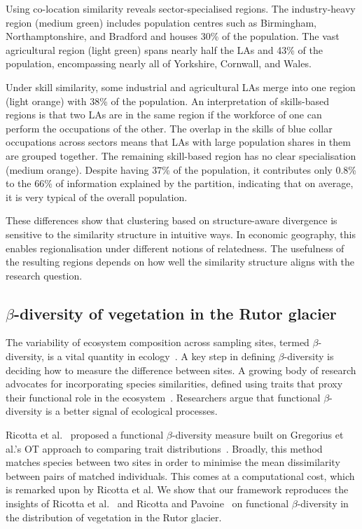 \documentclass[aps,pre,floats,floatfix,superscriptaddress,twocolumn,final,10pt]{revtex4-2}
\theoremstyle{definition}
\begin{document}
Using co-location similarity reveals sector-specialised regions. The industry-heavy region (medium green) includes population centres such as Birmingham, Northamptonshire, and Bradford and houses 30\% of the population. The vast agricultural region (light green) spans nearly half the LAs and 43\% of the population, encompassing nearly all of Yorkshire, Cornwall, and Wales.

Under skill similarity, some industrial and agricultural LAs merge into one region (light orange) with 38\% of the population. An interpretation of skills-based regions is that two LAs are in the same region if the workforce of one can perform the occupations of the other. The overlap in the skills of blue collar occupations across sectors means that LAs with large population shares in them are grouped together. The remaining skill-based region has no clear specialisation (medium orange). Despite having 37\% of the population, it contributes only 0.8\% to the 66\% of information explained by the partition, indicating that on average, it is very typical of the overall population. 

These differences show that clustering based on structure-aware divergence is sensitive to the similarity structure in intuitive ways. In economic geography, this enables regionalisation under different notions of relatedness. The usefulness of the resulting regions depends on how well the similarity structure aligns with the research question.



\subsection{$\beta$-diversity of vegetation in the Rutor glacier}
The variability of ecosystem composition across sampling sites, termed $\beta$-diversity, is a vital quantity in ecology~\cite{Whittaker1960,Anderson2011}. A key step in defining $\beta$-diversity is deciding how to measure the difference between sites. A growing body of research advocates for incorporating species similarities, defined using traits that proxy their functional role in the ecosystem~\cite{McGill2006,Violle2007}. Researchers argue that functional $\beta$-diversity is a better signal of ecological processes.

Ricotta et al.~\cite{Ricotta2021} proposed a functional $\beta$-diversity measure built on Gregorius et al.'s OT approach to comparing trait distributions~\cite{Gregorius2003}. Broadly, this method matches species between two sites in order to minimise the mean dissimilarity between pairs of matched individuals. This comes at a computational cost, which is remarked upon by Ricotta et al. We show that our framework reproduces the insights of Ricotta et al.~\cite{Ricotta2021} and Ricotta and Pavoine~\cite{Ricotta2024} on functional $\beta$-diversity in the distribution of vegetation in the Rutor glacier.
\end{document}
